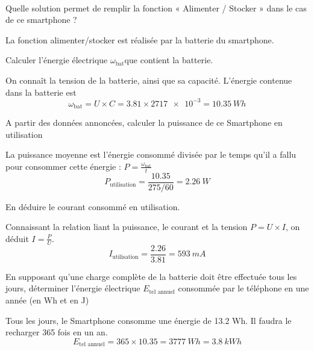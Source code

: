 \documentclass[10pt,fleqn]{article} %
\begin{document}
\begin{exercise}~

\begin{question}
  Quelle solution permet de remplir la fonction « Alimenter / Stocker » dans le cas de ce smartphone ?
\end{question}
\begin{solution}
  La fonction alimenter/stocker est réalisée par la batterie du smartphone.
\end{solution}

\begin{question}
  Calculer l’énergie électrique $\omega_\text{bat}$que contient la batterie.
\end{question}
\begin{solution}
  On connaît la tension de la batterie, ainsi que sa capacité. L'énergie
  contenue dans la batterie est $$\omega_\text{bat} = U\times C = 3.81 \times \num{2717e-3}=\SI{10.35}{Wh} $$
\end{solution}

\begin{question}
  A partir des données annoncées, calculer la puissance de ce Smartphone en
 utilisation
\end{question}
\begin{solution}
La puissance moyenne est l'énergie consommé divisée par le temps qu'il a fallu pour consommer cette énergie : $P = \frac{\omega_\text{bat}}{t}$
$$P_{\text{utilisation}} = \frac{10.35}{275/60} = \SI{2.26}{W}$$
\end{solution}

\begin{question}
  En déduire le courant consommé en utilisation.
\end{question}
\begin{solution}
  Connaissant la relation liant la puissance, le courant et la tension
  $P=U\times I$, on déduit $I = \frac{P}{U}$.
  $$I_{\text{utilisation}} = \frac{2.26}{3.81} = \SI{593}{mA}$$
\end{solution}

\begin{question}
  En supposant qu’une charge complète de la batterie doit être effectuée tous les jours, déterminer l’énergie électrique $E_{\text{tel annuel}}$ consommée par le téléphone en une année (en Wh et en J)
\end{question}
\begin{solution}
  Tous les jours, le Smartphone consomme une énergie de 13.2 Wh.
Il faudra le recharger 365 fois en un an.
$$E_{\text{tel annuel}} = 365 \times 10.35 = \SI{3 777}{Wh} = \SI{3.8}{kWh}$$
\end{solution}


\end{exercise}
\end{document}
